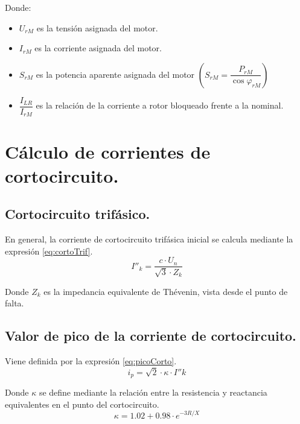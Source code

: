\begin{itemize}
                Donde:
                \begin{itemize}
                    \item $U_\textit{rM}$ es la tensión asignada del motor.
                    \item $I_\textit{rM}$ es la corriente asignada del motor.
                    \item $S_\textit{rM}$ es la potencia aparente asignada del motor $\left(S_\textit{rM} = \dfrac{P_\textit{rM}}{\cos\varphi_\textit{rM}}\right)$
                    \item $\dfrac{I_\textit{LR}}{I_\textit{rM}}$ es la relación de la corriente a rotor bloqueado frente a la nominal.
                \end{itemize}
        \end{itemize}

    \section{Cálculo de corrientes de cortocircuito.}
        \subsection{Cortocircuito trifásico.}
            En general, la corriente de cortocircuito trifásica inicial se calcula mediante la expresión \eqref{eq:cortoTrif}.
            \begin{equation}\label{eq:cortoTrif}
                I''_\textit{k} = \dfrac{c\cdot U_\textit{n}}{\sqrt{3}\cdot Z_\textit{k}}
            \end{equation}

            Donde $Z_\textit{k}$ es la impedancia equivalente de Thévenin, vista desde el punto de falta.

        \subsection{Valor de pico de la corriente de cortocircuito.}
            Viene definida por la expresión \eqref{eq:picoCorto}.
            \begin{equation}\label{eq:picoCorto}
                i_\textit{p} = \sqrt{2}\cdot \kappa \cdot I''\textit{k}
            \end{equation}

            Donde $\kappa$ se define mediante la relación entre la resistencia y reactancia equivalentes en el punto del cortocircuito.
            \begin{equation}
                \kappa = 1.02+0.98\cdot e^{-3R/X}
            \end{equation}

